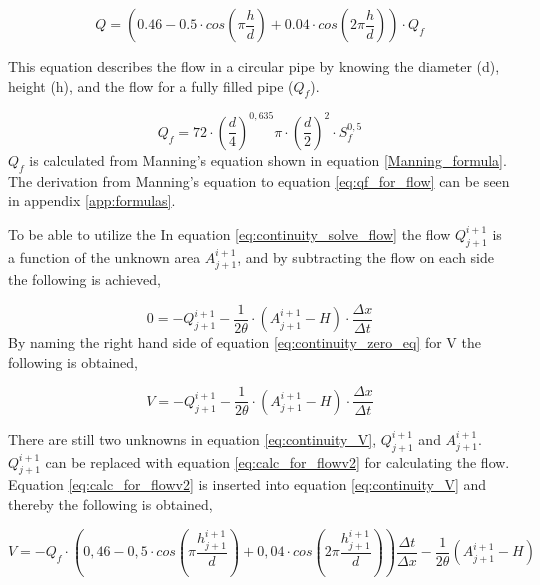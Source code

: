 \begin{equation}\label{eq:calc_for_flowv2}
     Q = \left(0.46-0.5 \cdot cos\left(\pi \frac{h}{d}\right)+0.04\cdot cos\left(2\pi\frac{h}{d}\right)\right)\cdot Q_f
\end{equation}

This equation describes the flow in a circular pipe by knowing the diameter (d), height (h), and the flow for a fully filled pipe ($Q_f$). %

\begin{equation}\label{eq:qf_for_flow}
    Q_f =72\cdot \left(\frac{d}{4}\right)^{0,635}\pi\cdot\left(\frac{d}{2}\right)^2\cdot S_f^{0,5}%
\end{equation}
$Q_f$ is calculated from Manning's equation shown in equation \ref{Manning_formula}. The derivation from Manning's equation to equation \ref{eq:qf_for_flow} can be seen in appendix \ref{app:formulas}.

To be able to utilize the 
In equation \ref{eq:continuity_solve_flow} the flow $Q_{j+1}^{i+1}$ is a function of the unknown area $A_{j+1}^{i+1}$, and by subtracting the flow on each side the following is achieved,

\begin{equation}\label{eq:continuity_zero_eq}
        0=-Q_{j+1}^{i+1}  - \frac{1}{2\theta}\cdot\left(A_{j+1}^{i+1}-H\right)\cdot \frac{\Delta x}{\Delta t}
\end{equation}
By naming the right hand side of equation \ref{eq:continuity_zero_eq} for V the following is obtained,

\begin{equation}\label{eq:continuity_V}
        V=-Q_{j+1}^{i+1}  - \frac{1}{2\theta}\cdot\left(A_{j+1}^{i+1}-H\right)\cdot \frac{\Delta x}{\Delta t}
\end{equation}

There are still two unknowns in equation \ref{eq:continuity_V}, $Q_{j+1}^{i+1}$ and $A_{j+1}^{i+1}$. $Q_{j+1}^{i+1}$ can be replaced with equation \ref{eq:calc_for_flowv2} for calculating the flow. Equation \ref{eq:calc_for_flowv2} is inserted into equation \ref{eq:continuity_V} and thereby the following is obtained,

\begin{equation}\label{eq:V_with_flow}
    V = -Q_f\cdot\left(0,46-0,5\cdot cos\left(\pi \frac{h_{j+1}^{i+1}}{d}\right)+0,04\cdot cos\left(2\pi\frac{h_{j+1}^{i+1}}{d}\right)\right)\frac{\Delta t}{\Delta x}-\frac{1}{2\theta}\left(A_{j+1}^{i+1}-H\right)
\end{equation}

